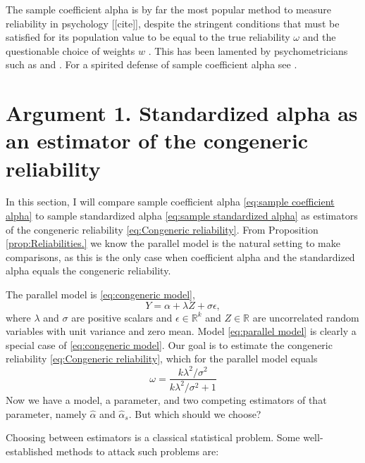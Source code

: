 \documentclass{article}
\theoremstyle{plain}
\theoremstyle{plain}
\theoremstyle{definition}
\theoremstyle{remark}
\theoremstyle{definition}
\theoremstyle{plain}
\theoremstyle{plain}
\theoremstyle{definition}
\DeclareMathOperator{\Cor}{Cor}
\begin{document}
The sample coefficient alpha is by far the most popular method to
measure reliability in psychology [[cite]], despite the stringent conditions
that must be satisfied for its population value to be equal to the
true reliability $\omega$ and the questionable choice of weights $w$ \citep{McNeish2019-ea}. This has been lamented by psychometricians such as \citet{McNeish2018-vu} and \citet{Sijtsma2009-hj}. For a spirited defense of sample coefficient alpha see \citep{Raykov2019-yr}.

\section{Argument 1. Standardized alpha as an estimator of the congeneric reliability}
\label{sec:arument 1}

In this section, I will compare sample coefficient alpha \eqref{eq:sample coefficient alpha} to sample standardized alpha \eqref{eq:sample standardized alpha} as estimators of the congeneric reliability \eqref{eq:Congeneric reliability}. From Proposition \ref{prop:Reliabilities.} we know the parallel model is the natural setting to make comparisons, as this is the only case when coefficient alpha and the standardized alpha equals the congeneric reliability.

The parallel model is
\eqref{eq:congeneric model},
\begin{equation}
\label{eq:parallel model}
Y = \alpha + \lambda Z + \sigma\epsilon,
\end{equation}
where $\lambda$ and $\sigma$ are positive scalars and $\epsilon\in\mathbb{R}^k$ and $Z\in\mathbb{R}$ are uncorrelated random variables with unit variance and zero mean. Model \eqref{eq:parallel model} is clearly a special case of \eqref{eq:congeneric model}. Our goal is to estimate the congeneric reliability \eqref{eq:Congeneric reliability}, which for the parallel model equals
\begin{equation}
\label{eq:parallel_omega}
\omega = \frac{k\lambda^2/\sigma^2}{k\lambda^2/\sigma^2 + 1}
\end{equation}
Now we have a model, a parameter, and two competing estimators of that parameter, namely $\widehat{\alpha}$ and $\widehat{\alpha}_s$. But which should we choose? 

Choosing between estimators is a classical statistical problem. Some well-established methods to attack such problems are:

\end{document}
